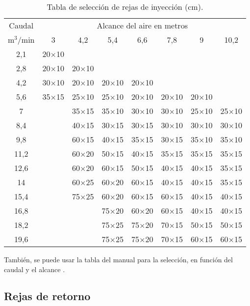\begin{table}[H]
	\centering
	\caption{Tabla de selección de rejas de inyección (cm).}\label{tab:rejas}
	\begin{tabular}{c|ccccccc}
		\hline
		Caudal & \multicolumn{7}{c}{Alcance del aire en metros} \\
		m$^3$/min & 3 & 4,2 & 5,4 & 6,6 & 7,8 & 9 & 10,2 \\ \hline
		2,1 & 20$\times$10 & & & & & & \\
		2,8 & 20$\times$10 & 20$\times$10 & & & & & \\
		4,2 & 30$\times$10 & 20$\times$10 & 20$\times$10 & 20$\times$10 & & & \\
		5,6& 35$\times$15 & 25$\times$10 & 25$\times$10 & 20$\times$10 & 20$\times$10 & 20$\times$10 & \\
		7 & & 35$\times$15 & 35$\times$10 & 30$\times$10 & 30$\times$10 & 25$\times$10 & 25$\times$10 \\
		8,4 & & 40$\times$15 & 30$\times$15 & 30$\times$15 & 30$\times$10 & 30$\times$10 & 30$\times$10\\
		9,8 & & 60$\times$15 & 40$\times$15 & 35$\times$15 & 30$\times$15 & 35$\times$10 & 35$\times$10 \\
		11,2 & & 60$\times$20 & 50$\times$15 & 40$\times$15 & 35$\times$15 & 35$\times$15 & 35$\times$15\\
		12,6 & & 60$\times$20 & 60$\times$15 & 50$\times$15 & 40$\times$15 & 40$\times$15 & 35$\times$15\\
		14 & & 60$\times$25 & 60$\times$20 & 60$\times$15 & 40$\times$15 & 40$\times$15 & 35$\times$15\\
		15,4 & & 75$\times$25 & 60$\times$20 & 60$\times$15 & 60$\times$15 & 40$\times$15 & 40$\times$15\\
		16,8 & & & 75$\times$20 & 60$\times$20 & 60$\times$15 & 40$\times$15 & 40$\times$15\\
		18,2 & & & 75$\times$25 & 75$\times$20 & 70$\times$15 & 50$\times$15 & 50$\times$15\\
		19,6 & & & 75$\times$25 & 75$\times$20 & 70$\times$15 & 60$\times$15 & 60$\times$15 \\
		\hline
	\end{tabular}
\end{table}

También, se puede usar la tabla del manual para la selección, en función del caudal y el alcance \parencite[pág. 205]{quadri2007manual}.

\subsection{Rejas de retorno}

